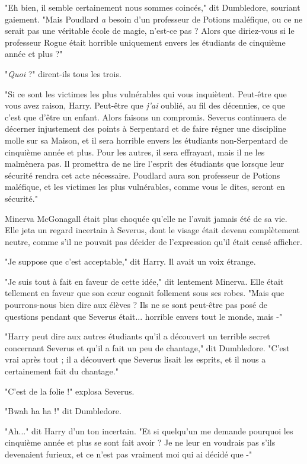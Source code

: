 "Eh bien, il semble certainement nous sommes coincés," dit Dumbledore, souriant gaiement. "Mais Poudlard \emph{a}  besoin d'un professeur de Potions maléfique, ou ce ne serait pas une véritable école de magie, n'est-ce pas ? Alors que diriez-vous si le professeur Rogue était horrible uniquement envers les étudiants de cinquième année et plus ?"

"\emph{Quoi}  ?" dirent-ils tous les trois.

"Si ce sont les victimes les plus vulnérables qui vous inquiètent. Peut-être que vous avez raison, Harry. Peut-être que \emph{j'ai}  oublié, au fil des décennies, ce que c'est que d'être un enfant. Alors faisons un compromis. Severus continuera de décerner injustement des points à Serpentard et de faire régner une discipline molle sur sa Maison, et il sera horrible envers les étudiants non-Serpentard de cinquième année et plus. Pour les autres, il sera effrayant, mais il ne les malmènera pas. Il promettra de ne lire l'esprit des étudiants que lorsque leur sécurité rendra cet acte nécessaire. Poudlard aura son professeur de Potions maléfique, et les victimes les plus vulnérables, comme vous le dites, seront en sécurité."

Minerva McGonagall était plus choquée qu'elle ne l'avait jamais été de sa vie. Elle jeta un regard incertain à Severus, dont le visage était devenu complètement neutre, comme s'il ne pouvait pas décider de l'expression qu'il était censé afficher.

"Je suppose que c'est acceptable," dit Harry. Il avait un voix étrange.

"Je suis tout à fait en faveur de cette idée," dit lentement Minerva. Elle était tellement en faveur que son cœur cognait follement sous ses robes. "Mais que pourrons-nous bien dire aux élèves ? Ils ne se sont peut-être pas posé de questions pendant que Severus était... horrible envers tout le monde, mais -"

"Harry peut dire aux autres étudiants qu'il a découvert un terrible secret concernant Severus et qu'il a fait un peu de chantage," dit Dumbledore. "C'est vrai après tout ; il a découvert que Severus lisait les esprits, et il nous a certainement fait du chantage."

"C'est de la folie !" explosa Severus.

"Bwah ha ha !" dit Dumbledore.

"Ah..." dit Harry d'un ton incertain. "Et si quelqu'un me demande pourquoi les cinquième année et plus se sont fait avoir ? Je ne leur en voudrais pas s'ils devenaient furieux, et ce n'est pas vraiment moi qui ai décidé que -"

